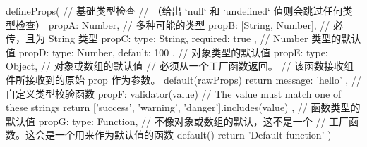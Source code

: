 \begin{codeJs}
defineProps({
    // 基础类型检查
    // （给出 `null` 和 `undefined` 值则会跳过任何类型检查）
    propA: Number,
    // 多种可能的类型
    propB: [String, Number],
    // 必传，且为 String 类型
    propC: {
        type: String,
        required: true
    },
    // Number 类型的默认值
    propD: {
        type: Number,
        default: 100
    },
    // 对象类型的默认值
    propE: {
        type: Object,
        // 对象或数组的默认值
        // 必须从一个工厂函数返回。
        // 该函数接收组件所接收到的原始 prop 作为参数。
        default(rawProps) {
        return { message: 'hello' }
        }
    },
    // 自定义类型校验函数
    propF: {
        validator(value) {
        // The value must match one of these strings
        return ['success', 'warning', 'danger'].includes(value)
        }
    },
    // 函数类型的默认值
    propG: {
        type: Function,
        // 不像对象或数组的默认，这不是一个
        // 工厂函数。这会是一个用来作为默认值的函数
        default() {
        return 'Default function'
        }
    }
    })
\end{codeJs}


